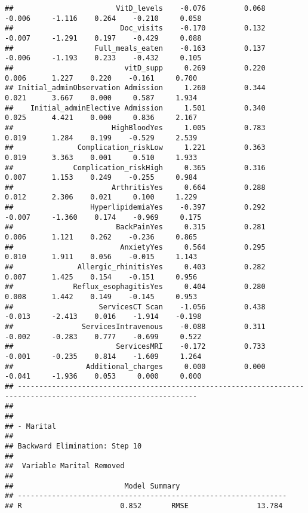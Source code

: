 \documentclass[
]{article}
\begin{document}
\begin{verbatim}
##                        VitD_levels    -0.076         0.068       -0.006     -1.116    0.264    -0.210     0.058 
##                         Doc_visits    -0.170         0.132       -0.007     -1.291    0.197    -0.429     0.088 
##                   Full_meals_eaten    -0.163         0.137       -0.006     -1.193    0.233    -0.432     0.105 
##                          vitD_supp     0.269         0.220        0.006      1.227    0.220    -0.161     0.700 
## Initial_adminObservation Admission     1.260         0.344        0.021      3.667    0.000     0.587     1.934 
##    Initial_adminElective Admission     1.501         0.340        0.025      4.421    0.000     0.836     2.167 
##                       HighBloodYes     1.005         0.783        0.019      1.284    0.199    -0.529     2.539 
##               Complication_riskLow     1.221         0.363        0.019      3.363    0.001     0.510     1.933 
##              Complication_riskHigh     0.365         0.316        0.007      1.153    0.249    -0.255     0.984 
##                       ArthritisYes     0.664         0.288        0.012      2.306    0.021     0.100     1.229 
##                  HyperlipidemiaYes    -0.397         0.292       -0.007     -1.360    0.174    -0.969     0.175 
##                        BackPainYes     0.315         0.281        0.006      1.121    0.262    -0.236     0.865 
##                         AnxietyYes     0.564         0.295        0.010      1.911    0.056    -0.015     1.143 
##               Allergic_rhinitisYes     0.403         0.282        0.007      1.425    0.154    -0.151     0.956 
##              Reflux_esophagitisYes     0.404         0.280        0.008      1.442    0.149    -0.145     0.953 
##                    ServicesCT Scan    -1.056         0.438       -0.013     -2.413    0.016    -1.914    -0.198 
##                ServicesIntravenous    -0.088         0.311       -0.002     -0.283    0.777    -0.699     0.522 
##                        ServicesMRI    -0.172         0.733       -0.001     -0.235    0.814    -1.609     1.264 
##                 Additional_charges     0.000         0.000       -0.041     -1.936    0.053     0.000     0.000 
## ----------------------------------------------------------------------------------------------------------------
## 
## 
## - Marital 
## 
## Backward Elimination: Step 10 
## 
##  Variable Marital Removed 
## 
##                          Model Summary                          
## ---------------------------------------------------------------
## R                       0.852       RMSE                13.784 

\end{verbatim}
\end{document}
